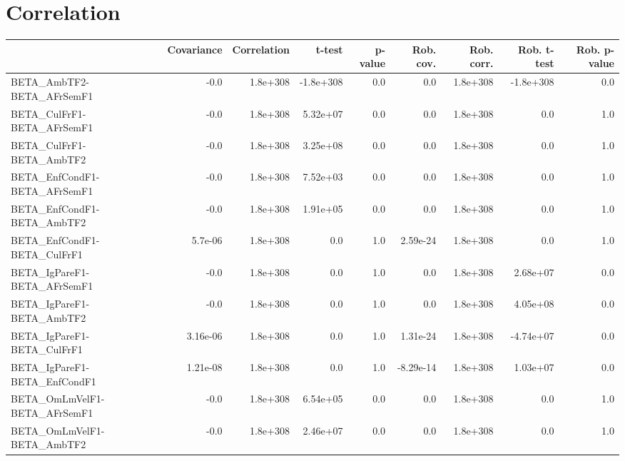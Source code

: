 \section{Correlation}
\begin{tabular}{lrrrrrrrr}
\toprule
{} &  Covariance &  Correlation &     t-test &  p-value &  Rob. cov. &  Rob. corr. &  Rob. t-test &  Rob. p-value \\
\midrule
BETA\_AmbTF2-BETA\_AFrSemF1             &        -0.0 &     1.8e+308 &  -1.8e+308 &      0.0 &        0.0 &    1.8e+308 &    -1.8e+308 &           0.0 \\
BETA\_CulFrF1-BETA\_AFrSemF1            &        -0.0 &     1.8e+308 &   5.32e+07 &      0.0 &        0.0 &    1.8e+308 &          0.0 &           1.0 \\
BETA\_CulFrF1-BETA\_AmbTF2              &        -0.0 &     1.8e+308 &   3.25e+08 &      0.0 &        0.0 &    1.8e+308 &          0.0 &           1.0 \\
BETA\_EnfCondF1-BETA\_AFrSemF1          &        -0.0 &     1.8e+308 &   7.52e+03 &      0.0 &        0.0 &    1.8e+308 &          0.0 &           1.0 \\
BETA\_EnfCondF1-BETA\_AmbTF2            &        -0.0 &     1.8e+308 &   1.91e+05 &      0.0 &        0.0 &    1.8e+308 &          0.0 &           1.0 \\
BETA\_EnfCondF1-BETA\_CulFrF1           &     5.7e-06 &     1.8e+308 &        0.0 &      1.0 &   2.59e-24 &    1.8e+308 &          0.0 &           1.0 \\
BETA\_IgPareF1-BETA\_AFrSemF1           &        -0.0 &     1.8e+308 &        0.0 &      1.0 &        0.0 &    1.8e+308 &     2.68e+07 &           0.0 \\
BETA\_IgPareF1-BETA\_AmbTF2             &        -0.0 &     1.8e+308 &        0.0 &      1.0 &        0.0 &    1.8e+308 &     4.05e+08 &           0.0 \\
BETA\_IgPareF1-BETA\_CulFrF1            &    3.16e-06 &     1.8e+308 &        0.0 &      1.0 &   1.31e-24 &    1.8e+308 &    -4.74e+07 &           0.0 \\
BETA\_IgPareF1-BETA\_EnfCondF1          &    1.21e-08 &     1.8e+308 &        0.0 &      1.0 &  -8.29e-14 &    1.8e+308 &     1.03e+07 &           0.0 \\
BETA\_OmLmVelF1-BETA\_AFrSemF1          &        -0.0 &     1.8e+308 &   6.54e+05 &      0.0 &        0.0 &    1.8e+308 &          0.0 &           1.0 \\
BETA\_OmLmVelF1-BETA\_AmbTF2            &        -0.0 &     1.8e+308 &   2.46e+07 &      0.0 &        0.0 &    1.8e+308 &          0.0 &           1.0 \\

\end{tabular}
